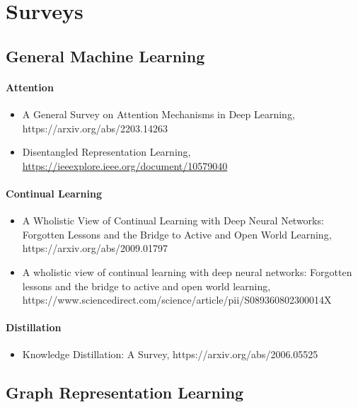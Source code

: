\section{Surveys}

\subsection{General Machine Learning}

\paragraph{Attention}

\begin{itemize}
\item A General Survey on Attention Mechanisms in Deep Learning, https://arxiv.org/abs/2203.14263

\item \New Disentangled Representation Learning, \url{https://ieeexplore.ieee.org/document/10579040}
\end{itemize}

\paragraph{Continual Learning}

\begin{itemize}
\item A Wholistic View of Continual Learning with Deep Neural Networks: Forgotten Lessons and the Bridge to Active and Open World Learning, https://arxiv.org/abs/2009.01797

\item A wholistic view of continual learning with deep neural networks: Forgotten lessons and the bridge to active and open world learning, https://www.sciencedirect.com/science/article/pii/S089360802300014X
\end{itemize}

\paragraph{Distillation}

\begin{itemize}
\item Knowledge Distillation: A Survey, https://arxiv.org/abs/2006.05525
\end{itemize}

\subsection{Graph Representation Learning}

